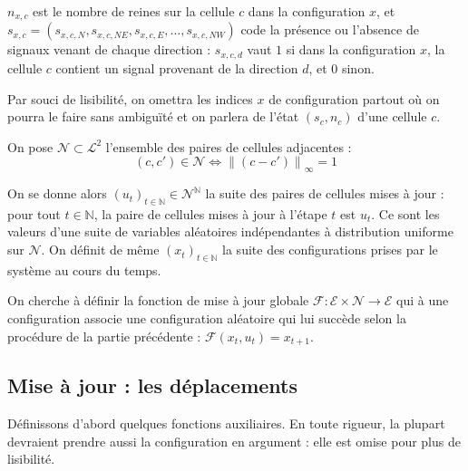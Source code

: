 \documentclass[11pt, openany]{article}
\newcommand{\N}{\mathbb{N}}
\newcommand{\norm}[1]{\left\lVert#1\right\rVert}
\newcommand{\La}{\mathcal{L}}
\newcommand{\Ne}{\mathcal{N}}
\newcommand{\E}{\mathcal{E}}
\begin{document}
\noindent
$n_{x,c}$ est le nombre de reines sur la cellule $c$ dans la configuration $x$, et $s_{x,c} = (s_{x,c,N}, s_{x,c,NE}, s_{x,c,E}, \ldots, s_{x,c,NW})$ code la présence ou l'absence de signaux venant de chaque direction : $s_{x,c,d}$ vaut $1$ si dans la configuration $x$, la cellule $c$ contient un signal provenant de la direction $d$, et $0$ sinon.


Par souci de lisibilité, on omettra les indices $x$ de configuration partout où on pourra le faire sans ambiguïté et on parlera de l'état $(s_c, n_c)$ d'une cellule $c$.

On pose $\Ne \subset \La^2$ l'ensemble des paires de cellules adjacentes : $$(c, c') \in \Ne \iff \norm{(c-c')}_\infty = 1$$

On se donne alors $(u_t)_{t\in\N} \in \Ne^\N$ la suite des paires de cellules mises à jour : pour tout $t\in\N$, la paire de cellules mises à jour à l'étape $t$ est $u_t$. Ce sont les valeurs d'une suite de variables aléatoires indépendantes à distribution uniforme sur $\Ne$. On définit de même $(x_t)_{t\in\N}$ la suite des configurations prises par le système au cours du temps.

On cherche à  définir la fonction de mise à jour globale $\mathcal{F} : {\E\times\Ne}\to\E$ qui à une configuration associe une configuration aléatoire qui lui succède selon la procédure de la partie précédente : $\mathcal{F}(x_t, u_t) = x_{t+1}$.


\subsection*{Mise à jour : les déplacements}

Définissons d'abord quelques fonctions auxiliaires. En toute rigueur, la plupart devraient prendre aussi la configuration en argument : elle est omise pour plus de lisibilité.
\end{document}
